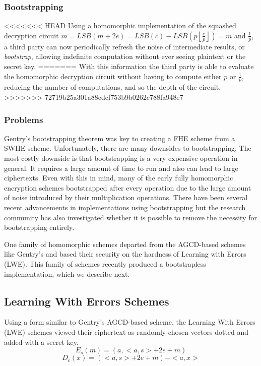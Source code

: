 \documentclass[letterpaper,twocolumn,10pt]{article}
\newcommand{\floor}[1]{\left\lfloor #1 \right\rfloor}
\begin{document}
\subsubsection{Bootstrapping}

<<<<<<< HEAD
Using a homomorphic implementation of the squashed decryption circuit $m = LSB(m + 2e) = LSB(c) - LSB(p\floor{\frac{c}{p}}) = m$ and $\frac{1}{p}$, a third party can now periodically refresh the noise of intermediate results, or \emph{bootstrap}, allowing indefinite computation without ever seeing plaintext or the secret key.
=======
With this information the third party is able to evaluate the homomorphic decryption circuit without having to compute either $p$ or $\frac{1}{p}$, reducing the number of computations, and so the depth of the circuit.
>>>>>>> 72719b25a301a88cdcf753b9b0262c788fa948e7

\subsubsection{Problems}
Gentry's bootstrapping theorem was key to creating a FHE scheme from a SWHE scheme. Unfortunately, there are many downsides to bootstrapping. The most costly downside is that bootstrapping is a very expensive operation in general. It requires a large amount of time to run\cite{ImplementingGentry} and also can lead to large ciphertexts. Even with this in mind, many of the early fully homomorphic encryption schemes bootstrapped after every operation due to the large amount of noise introduced by their multiplication operations. There have been several recent advancements in implementations using bootstrapping\cite{StehleSteinfeld, SmartVercauteren, ImplementingGentry, CNT} but the research community has also investigated whether it is possible to remove the necessity for bootstrapping entirely. 

One family of homomorphic schemes departed from the AGCD-based schemes like Gentry's and based their security on the hardness of Learning with Errors (LWE). This family of schemes recently produced a bootstrapless implementation, which we describe next.

\subsection{Learning With Errors Schemes}
\label{sec:lwe}
Using a form similar to Gentry's AGCD-based scheme, the Learning With Errors (LWE) schemes\cite{SansBootstrapping} viewed their ciphertext as randomly chosen vectors dotted and added with a secret key.
$$E_s(m) = (a, <a,s> + 2e + m)$$
$$D_c(x) = (<a,s> + 2e + m) - <a,x>$$
\end{document}
